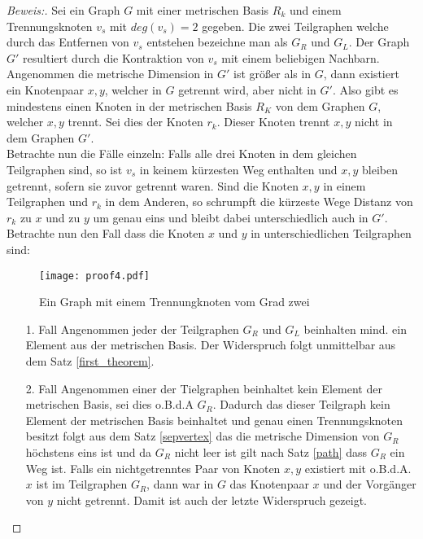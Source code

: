 \begin{proof}[Beweis:]
Sei ein Graph $G$ mit einer metrischen Basis $R_k$ und einem Trennungsknoten $v_s$ mit $deg(v_s)=2$ gegeben. Die zwei Teilgraphen welche durch das Entfernen von $v_s$ entstehen bezeichne man als $G_R$ und $G_L$. Der Graph $G'$ resultiert durch die Kontraktion von $v_s$ mit einem beliebigen Nachbarn.\\
Angenommen die metrische Dimension in $G'$ ist größer als in $G$, dann existiert ein Knotenpaar $x,y$, welcher in $G$ getrennt wird, aber nicht in $G'$. Also gibt es mindestens einen Knoten in der metrischen Basis $R_K$ von dem Graphen $G$, welcher $x,y$ trennt. Sei dies der Knoten $r_k$. Dieser Knoten trennt  $x,y$ nicht in dem Graphen $G'$.\\
Betrachte nun die Fälle einzeln: Falls alle drei Knoten in dem gleichen Teilgraphen sind, so ist $v_s$ in keinem kürzesten Weg enthalten und $x,y$ bleiben getrennt, sofern sie zuvor getrennt waren. Sind die Knoten $x,y$ in einem Teilgraphen und $r_k$ in dem Anderen, so schrumpft die kürzeste Wege Distanz von $r_k$ zu $x$ und zu $y$ um genau eins und bleibt dabei unterschiedlich auch in $G'$. Betrachte nun den Fall dass die Knoten $x$ und $y$ in unterschiedlichen Teilgraphen sind:
  \begin{figure}[h!]
		\centering 		 
  \texttt{[image: proof4.pdf]}
	\caption{Ein Graph mit einem Trennungknoten vom Grad zwei}
  	 \end{figure}
\begin{enumerate}
\item[1. Fall] Angenommen jeder der Teilgraphen $G_R$ und $G_L$ beinhalten mind. ein Element aus der metrischen Basis. Der Widerspruch folgt unmittelbar aus dem Satz \ref{first_theorem}.
\item[2. Fall] Angenommen einer der Tielgraphen beinhaltet kein Element der metrischen Basis, sei dies o.B.d.A $G_R$.
Dadurch das dieser Teilgraph kein Element der metrischen Basis beinhaltet und genau einen Trennungsknoten besitzt folgt aus dem Satz \ref{sepvertex} das die metrische Dimension von $G_R$ höchstens eins ist und da $G_R$ nicht leer ist gilt nach Satz \ref{path} dass $G_R$ ein Weg ist. Falls ein nichtgetrenntes Paar von Knoten $x,y$ existiert mit o.B.d.A. $x$ ist im Teilgraphen $G_R$, dann war in $G$ das Knotenpaar $x$ und der Vorgänger von $y$ nicht getrennt. Damit ist auch der letzte Widerspruch gezeigt.


\end{enumerate}
\end{proof}
